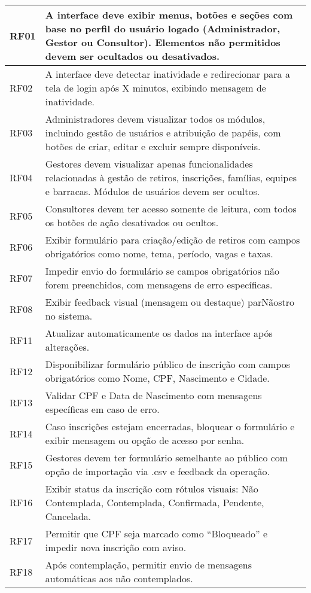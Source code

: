 \begin{longtable}{|p{4cm}|>{\raggedright\arraybackslash}p{\dimexpr\linewidth-4.2cm}|}
RF01 & A interface deve exibir menus, botões e seções com base no perfil do usuário logado (Administrador, Gestor ou Consultor). Elementos não permitidos devem ser ocultados ou desativados. \\
\hline
RF02 & A interface deve detectar inatividade e redirecionar para a tela de login após X minutos, exibindo mensagem de inatividade. \\
\hline
RF03 & Administradores devem visualizar todos os módulos, incluindo gestão de usuários e atribuição de papéis, com botões de criar, editar e excluir sempre disponíveis. \\
\hline
RF04 & Gestores devem visualizar apenas funcionalidades relacionadas à gestão de retiros, inscrições, famílias, equipes e barracas. Módulos de usuários devem ser ocultos. \\
\hline
RF05 & Consultores devem ter acesso somente de leitura, com todos os botões de ação desativados ou ocultos. \\
\hline
RF06 & Exibir formulário para criação/edição de retiros com campos obrigatórios como nome, tema, período, vagas e taxas. \\
\hline
RF07 & Impedir envio do formulário se campos obrigatórios não forem preenchidos, com mensagens de erro específicas. \\
\hline
RF08 & Exibir feedback visual (mensagem ou destaque) parNãostro no sistema. \\
\hline
RF11 & Atualizar automaticamente os dados na interface após alterações. \\
\hline
RF12 & Disponibilizar formulário público de inscrição com campos obrigatórios como Nome, CPF, Nascimento e Cidade. \\
\hline
RF13 & Validar CPF e Data de Nascimento com mensagens específicas em caso de erro. \\
\hline
RF14 & Caso inscrições estejam encerradas, bloquear o formulário e exibir mensagem ou opção de acesso por senha. \\
\hline
RF15 & Gestores devem ter formulário semelhante ao público com opção de importação via .csv e feedback da operação. \\
\hline
RF16 & Exibir status da inscrição com rótulos visuais: Não Contemplada, Contemplada, Confirmada, Pendente, Cancelada. \\
\hline
RF17 & Permitir que CPF seja marcado como “Bloqueado” e impedir nova inscrição com aviso. \\
\hline
RF18 & Após contemplação, permitir envio de mensagens automáticas aos não contemplados. \\

\end{longtable}
